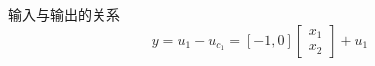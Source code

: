 \begin{mdframed}[linewidth=0pt, backgroundcolor=gray!12]
\begin{pf}
        输入与输出的关系
        \begin{equation}
            y=u_1-u_{c_1}=[-1,0]
            \left[
                \begin{array}{c}
                    x_1 \\
                    x_2 
                \end{array}
            \right]+
            u_1
        \end{equation}
    \end{pf}
\end{mdframed}

